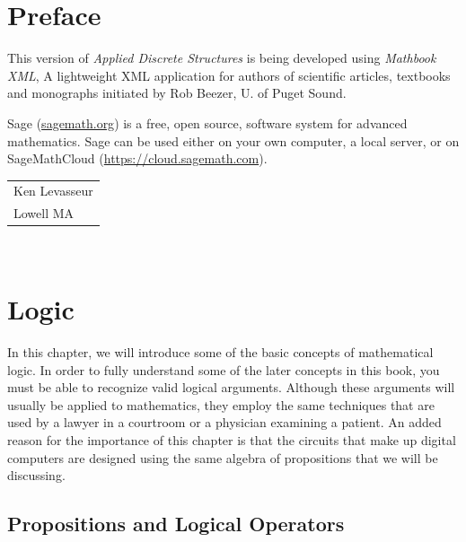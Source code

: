 \documentclass[10pt,]{book}
\theoremstyle{plain}
\theoremstyle{definition}
\theoremstyle{definition}
\theoremstyle{definition}
\theoremstyle{definition}
\begin{document}
\chapter*{Preface}\label{preface-1}
This version of \emph{Applied Discrete Structures} is being developed using \emph{Mathbook XML}, A lightweight XML application for authors of scientific articles, textbooks and monographs initiated by Rob Beezer, U. of Puget Sound.  %
\par
Sage (\href{http://sagemath.org}{sagemath.org}) is a free, open source, software system for advanced mathematics.  Sage can be used either on your own computer, a local server, or on SageMathCloud (\href{https://cloud.sagemath.com}{https://cloud.sagemath.com}). %
\par\hfill\begin{tabular}{l@{}}
Ken Levasseur\\
Lowell MA
\end{tabular}\\\par
\setcounter{tocdepth}{1}
\renewcommand*\contentsname{Contents}
\tableofcontents
\mainmatter
\typeout{************************************************}
\typeout{************************************************}
\chapter[Logic]{Logic}\label{chapter3}
\typeout{************************************************}
\typeout{************************************************}
In this chapter, we will introduce some of the basic concepts of mathematical logic. In order to fully understand some of the later concepts in this 	book, you must be able to recognize valid logical arguments. Although these arguments will usually be applied to mathematics, they employ the same techniques that are used by a lawyer in a courtroom or a physician examining a patient. An added reason for the importance of this chapter is that the circuits that make up digital computers are designed using the same algebra of propositions that we will be discussing.%
\typeout{************************************************}
\typeout{************************************************}
\section[Propositions and Logical Operators]{Propositions and Logical Operators}\label{c3s1}
\typeout{************************************************}
\typeout{************************************************}
\end{document}

